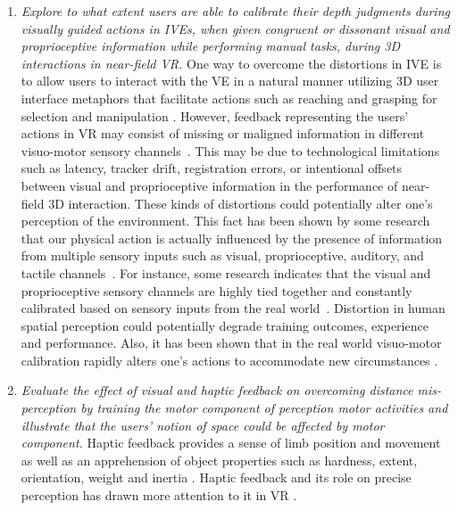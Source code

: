\begin{enumerate}
	\item \textit{Explore to what extent users are able to calibrate their depth judgments during visually guided actions in IVEs, when given congruent or dissonant visual and proprioceptive information while performing manual tasks, during 3D interactions in near-field VR.} One way to overcome the distortions in IVE is to allow users to interact with the VE in a natural manner utilizing 3D user interface metaphors that facilitate actions such as reaching and grasping for selection and manipulation \cite{ANL+12,LBB99,BKL+04}. However, feedback representing the users' actions in VR may consist of missing or maligned information in different visuo-motor sensory channels~\cite{CM03}. This may be due to technological limitations such as latency, tracker drift, registration errors, or intentional offsets between visual and proprioceptive information in the performance of near-field 3D interaction. These kinds of distortions could potentially alter one's perception of the environment. This fact has been shown by some research that our physical action is actually influenced by the presence of information from multiple sensory inputs such as visual, proprioceptive, auditory, and tactile channels~\cite{G66}. For instance, some research indicates that the visual and proprioceptive sensory channels are highly tied together and constantly calibrated based on sensory inputs from the real world~\cite{BP98}. Distortion in human spatial perception could potentially degrade training outcomes, experience and performance. Also, it has been shown that in the real world visuo-motor calibration rapidly alters one's actions to accommodate new circumstances \cite{BP98,BC12}. 
	
	\item \textit{Evaluate the effect of visual and haptic feedback on overcoming distance mis-perception by training the motor component of perception motor activities and illustrate that the users' notion of space could be affected by motor component.} Haptic feedback provides a sense of limb position and movement as well as an apprehension of object properties such as hardness, extent, orientation, weight and inertia \cite{PT92,pt98}. Haptic feedback and its role on precise perception has drawn more attention to it in VR \cite{bb+96}. 
	

\end{enumerate}
